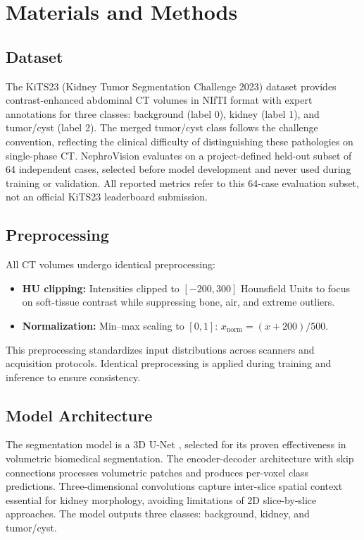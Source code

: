 \section{Materials and Methods}

\subsection{Dataset}

The KiTS23 (Kidney Tumor Segmentation Challenge 2023) dataset \cite{kits23} provides contrast-enhanced abdominal CT volumes in NIfTI format with expert annotations for three classes: background (label 0), kidney (label 1), and tumor/cyst (label 2). The merged tumor/cyst class follows the challenge convention, reflecting the clinical difficulty of distinguishing these pathologies on single-phase CT. NephroVision evaluates on a project-defined held-out subset of 64 independent cases, selected before model development and never used during training or validation. All reported metrics refer to this 64-case evaluation subset, not an official KiTS23 leaderboard submission.

\subsection{Preprocessing}

All CT volumes undergo identical preprocessing:
\begin{itemize}
    \item \textbf{HU clipping:} Intensities clipped to $[-200, 300]$ Hounsfield Units to focus on soft-tissue contrast while suppressing bone, air, and extreme outliers.
    \item \textbf{Normalization:} Min--max scaling to $[0, 1]$: $x_{\text{norm}} = (x + 200) / 500$.
\end{itemize}

This preprocessing standardizes input distributions across scanners and acquisition protocols. Identical preprocessing is applied during training and inference to ensure consistency.

\subsection{Model Architecture}

The segmentation model is a 3D U-Net \cite{unet3d}, selected for its proven effectiveness in volumetric biomedical segmentation. The encoder-decoder architecture with skip connections processes volumetric patches and produces per-voxel class predictions. Three-dimensional convolutions capture inter-slice spatial context essential for kidney morphology, avoiding limitations of 2D slice-by-slice approaches. The model outputs three classes: background, kidney, and tumor/cyst.

